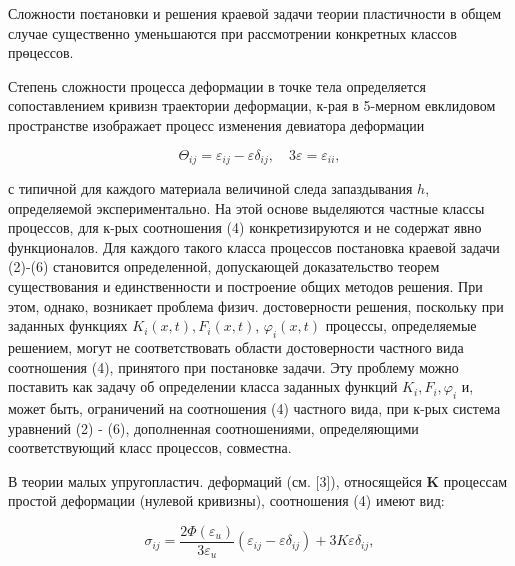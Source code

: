 \documentclass[10pt]{article}
\begin{document}
Сложности поєтановки и решения краевой задачи теории пластичности в общем случае существенно уменьшаются при рассмотрении конкретных классов прөцессов.



Степень сложности процесса деформации в точке тела определяется сопоставлением кривизн траектории деформации, к-рая в 5-мерном евклидовом пространстве изображает процесс изменения девиатора деформации



\[

\Theta_{i j}=\varepsilon_{i j}-\varepsilon \delta_{i j}, \quad 3 \varepsilon=\varepsilon_{i i},

\]



с типичной для каждого материала величиной следа запаздывания $h$, определяемой экспериментально. На этой основе выделяются частные классы процессов, для к-рых соотношения (4) конкретизируются и не содержат явно функционалов. Для каждого такого класса процессов постановка краевой задачи (2)-(6) становится определенной, допускающей доказательство теорем существования и единственности и построение общих методов решения. При этом, однако, возникает проблема физич. достоверности решения, поскольку при заданных функциях $K_{i}(x, t), F_{i}(x, t)$, $\varphi_{i}(x, t)$ процессы, определяемые решением, могут не соответствовать области достоверности частного вида соотношения (4), принятого при постановке задачи. Эту проблему можно поставить как задачу об определении класса заданных функций $K_{i}, F_{i}, \varphi_{i}$ и, может быть, ограничений на соотношения (4) частного вида, при к-рых система уравнений (2) - (6), дополненная соотношениями, определяющими соответствующий класс процессов, совместна.



В теории малых упругопластич. деформаций (см. [3]), относящейся $\mathbf{K}$ процессам простой деформации (нулевой кривизны), соотношения (4) имеют вид:



\[

\sigma_{i j}=\frac{2 \Phi\left(\varepsilon_{u}\right)}{3 \varepsilon_{u}}\left(\varepsilon_{i j}-\varepsilon \delta_{i j}\right)+3 K \varepsilon \delta_{i j},

\]
\end{document}
